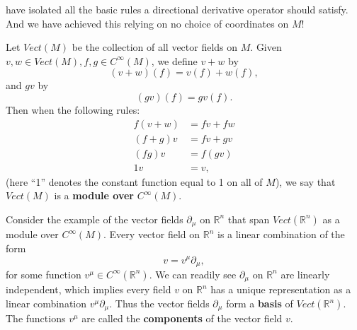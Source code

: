 \documentclass[a4paper,11pt]{article}
\theoremstyle{remark}
\begin{document}
have isolated all the basic rules a directional derivative operator
should satisfy. And we have achieved this relying on no choice of
coordinates on $M$!\par
Let $Vect(M)$ be the collection of all vector fields on $M$. Given $v,
w \in Vect(M), f, g \in C^{\infty}(M)$, we define $v+w$ by $$(v+w)(f)
= v(f) + w(f),$$ and $g v$ by $$(g v)(f) = g v(f).$$ Then when the
following rules:
\begin{align*}
  f(v + w) &= f v + f w\\
  (f + g)v &= f v + g v\\
  (f g)v &= f(g v)\\
  1 v &= v,
\end{align*}
(here ``1'' denotes the constant function equal to 1 on all of $M$),
we say that $Vect(M)$ is a \textbf{module over} $C^{\infty}(M)$.\par
Consider the example of the vector fields ${\partial_\mu}$ on
$\mathbb{R}^n$ that span $Vect(\mathbb{R}^n)$ as a module over
$C^{\infty}(M)$. Every vector field on $\mathbb{R}^n$ is a linear
combination of the form $$v = v^{\mu} \partial_{\mu},$$ for some
function $v^{\mu} \in C^{\infty}(\mathbb{R}^n)$. We can readily see
${\partial_{\mu}}$ on $\mathbb{R}^n$ are linearly independent, which
implies every field $v$ on $\mathbb{R}^n$ has a unique representation
as a linear combination $v^{\mu} \partial_{\mu}$. Thus the vector
fields ${\partial_{\mu}}$ form a \textbf{basis} of
$Vect(\mathbb{R}^n)$. The functions $v^{\mu}$ are called the
\textbf{components} of the vector field $v$.
\end{document}
